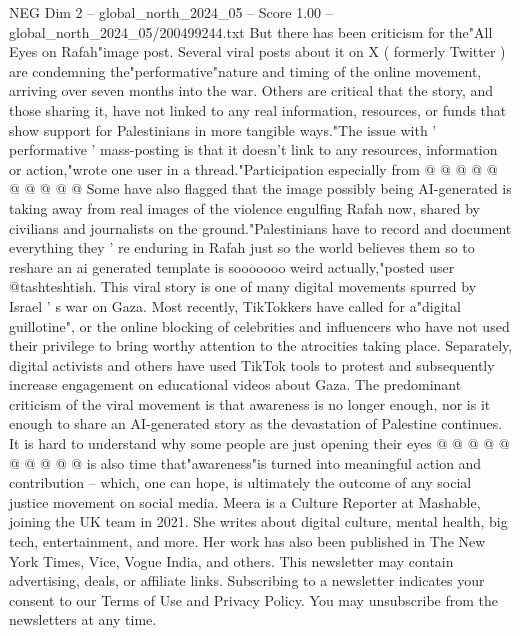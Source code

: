 \begin{textsample}{NEG Dim 2 – global\_north\_2024\_05 – Score 1.00 – global\_north\_2024\_05/200499244.txt}
But there has been criticism for the"All Eyes on Rafah"image post.
Several viral posts about it on X ( formerly Twitter ) are condemning the"performative"nature and timing of the online movement, arriving over seven months into the war.
Others are critical that the story, and those sharing it, have not linked to any real information, resources, or funds that show support for Palestinians in more tangible ways."The issue with ' performative ' mass-posting is that it doesn't link to any resources, information or action,"wrote one user in a thread."Participation especially from @ @ @ @ @ @ @ @ @ @ Some have also flagged that the image possibly being AI-generated is taking away from real images of the violence engulfing Rafah now, shared by civilians and journalists on the ground."Palestinians have to record and document everything they ' re enduring in Rafah just so the world believes them so to reshare an ai generated template is sooooooo weird actually,"posted user @tashteshtish.
This viral story is one of many digital movements spurred by Israel ' s war on Gaza.
Most recently, TikTokkers have called for a"digital guillotine", or the online blocking of celebrities and influencers who have not used their privilege to bring worthy attention to the atrocities taking place.
Separately, digital activists and others have used TikTok tools to protest and subsequently increase engagement on educational videos about Gaza.
The predominant criticism of the viral movement is that awareness is no longer enough, nor is it enough to share an AI-generated story as the devastation of Palestine continues.
It is hard to understand why some people are just opening their eyes @ @ @ @ @ @ @ @ @ @ is also time that"awareness"is turned into meaningful action and contribution -- which, one can hope, is ultimately the outcome of any social justice movement on social media.
Meera is a Culture Reporter at Mashable, joining the UK team in 2021.
She writes about digital culture, mental health, big tech, entertainment, and more.
Her work has also been published in The New York Times, Vice, Vogue India, and others.
This newsletter may contain advertising, deals, or affiliate links.
Subscribing to a newsletter indicates your consent to our Terms of Use and Privacy Policy.
You may unsubscribe from the newsletters at any time.

\end{textsample}

